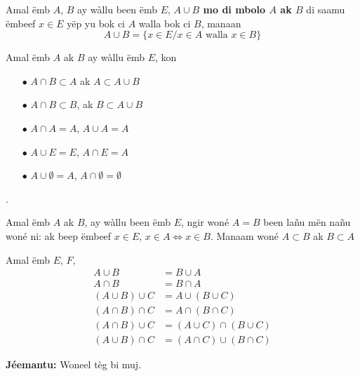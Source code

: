 \documentclass[twoside, a4paper]{article}
\begin{document}
\begin{tcolorbox}[enhanced jigsaw,breakable,pad at break*=1mm, colback=red!5!white,colframe=white!75!black,title= Téeki,watermark color=white]
  Amal ëmb $A$, $B$ ay wàllu been ëmb $E$, \textbf{$A\cup B$ mo di mbolo $A$ ak $B$} di saamu ëmbeef $x\in E$ yëp yu bok ci $A$ walla bok ci $B$, manaan $$A\cup B = \big\{x \in E/ x \in A \text{ walla } x \in B\big\}$$
\end{tcolorbox}
\begin{tcolorbox}[enhanced jigsaw,breakable,pad at break*=1mm, colback=orange!5!white,colframe=white!75!black,title= Seetlu,
    watermark color=white]
  Amal ëmb $A$ ak $B$ ay wàllu ëmb $E$, kon
  \begin{itemize}
    \item[$\bullet$] $A\cap B \subset A$ ak $A \subset A \cup B$
    \item[$\bullet$] $A\cap B \subset B$, ak $ B\subset A \cup B$
    \item[$\bullet$] $A\cap A=A$, $A\cup A = A$
    \item[$\bullet$] $A\cup E = E$, $A\cap E = A$
    \item[$\bullet$] $A\cup \emptyset = A$, $A\cap \emptyset = \emptyset$
  \end{itemize}.

\end{tcolorbox}


\begin{tcolorbox}[enhanced jigsaw,breakable,pad at break*=1mm, colback=green!5!white,colframe=white!75!black,title= Tègtal\footnote{Indication ?},
    watermark color=white]
  Amal ëmb $A$ ak $B$, ay wàllu been ëmb $E$, ngir woné $A=B$ been lañu mën nañu woné ni: ak beep ëmbeef $x\in E$, $x\in A \iff x \in B$. Manaam woné $A \subset B$ ak $B \subset A$
\end{tcolorbox}

\begin{tcolorbox}[enhanced jigsaw,breakable,pad at break*=1mm, colback=blue!5!white,colframe=white!75!black,title= Tèg\footnote{Proposition},
    watermark color=white]
  Amal ëmb $E$, $F$,
  \begin{align*}
    A \cup B          & = B \cup A                   \\
    A \cap B          & = B \cap A                   \\
    (A \cup B) \cup C & = A \cup (B \cup C)          \\
    (A \cap B) \cap C & = A \cap (B \cap C)          \\
    (A \cap B) \cup C & = (A \cup C) \cap (B \cup C) \\
    (A \cup B) \cap C & = (A \cap C) \cup (B \cap C)
  \end{align*}
\end{tcolorbox}
\textbf{Jéemantu:} Woneel tèg bi muj.
\end{document}
